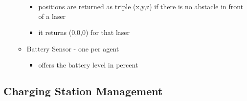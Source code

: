 \documentclass{article}
\begin{document}
\begin{enumerate}
\begin{itemize}
\begin{itemize}
			\item positions are returned as triple (x,y,z) if there is no abstacle in front of a laser 
			\item it returns (0,0,0) for that laser
		\end{itemize}
		\item Battery Sensor - one per agent
		\begin{itemize}
			\item offers the battery level in percent
		\end{itemize}
	\end{itemize}
\end{enumerate}

\subsection{Charging Station Management}
\end{document}
